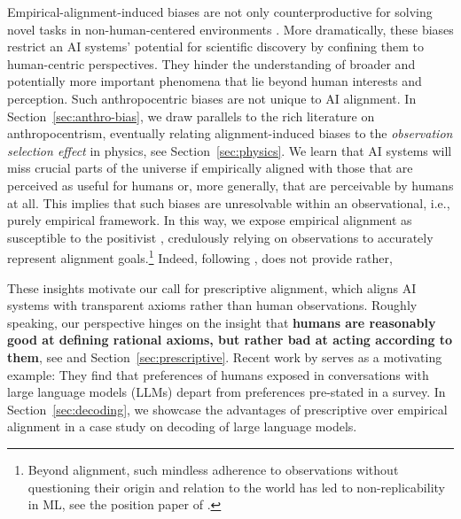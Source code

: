 \documentclass{article}
\theoremstyle{plain}
\theoremstyle{definition}
\theoremstyle{remark}
\begin{document}
Empirical-alignment-induced biases are not only counterproductive for solving novel tasks in non-human-centered environments \cite{yangposition}. More dramatically, these biases restrict an AI systems' potential for scientific discovery by confining them to human-centric perspectives. They hinder the understanding of broader and potentially more important phenomena that lie beyond human interests and perception. 
%
Such anthropocentric biases are not unique to AI alignment. In Section~\ref{sec:anthro-bias}, we draw parallels to the rich literature on anthropocentrism, eventually relating alignment-induced biases to the \textit{observation selection effect} in physics, see Section~\ref{sec:physics}. We learn that AI systems will miss crucial parts of the universe if empirically aligned with those that are perceived as useful for humans or, more generally, that are perceivable by humans at all. This implies that such biases are unresolvable within an observational, i.e., purely empirical framework. In this way, we expose empirical alignment as susceptible to the positivist  \citep[page~vii]{horkheimer_adorno_dda_engl}, credulously relying on observations to accurately represent alignment goals.\footnote{Beyond alignment, such mindless adherence to observations without questioning their origin and relation to the world has led to non-replicability in ML, see the position paper of \citet{herrmann2024position}.} Indeed, following {\citet[page~93-94]{popper:logic}}, does not provide  rather,  
%

These insights motivate our call for prescriptive alignment, which aligns AI systems with transparent axioms rather than human observations. Roughly speaking, our perspective hinges on the insight that \textbf{humans are reasonably good at defining rational axioms, but rather bad at acting according to them}, see \citet{tversky1974judgment,Birnbaum_2016} and Section~\ref{sec:prescriptive}. 
Recent work by \citet{kirk2024prism} serves as a motivating example: They find that preferences of humans exposed in conversations with large language models (LLMs) depart from preferences pre-stated in a survey.
In Section~\ref{sec:decoding}, we showcase the advantages of prescriptive over empirical alignment in a case study on decoding of large language models.
\end{document}
